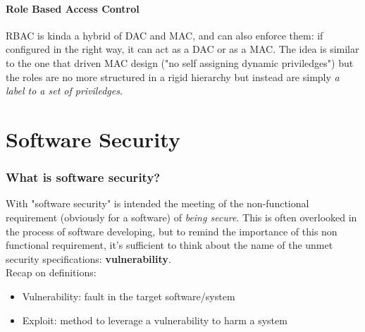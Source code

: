 \documentclass{article}
\begin{document}
			\subsection{Role Based Access Control}
				RBAC is kinda a hybrid of DAC and MAC, and can also enforce them: if configured in the right way, it can act as a DAC or as a MAC. The idea is similar to the one that driven MAC design ("no self assigning dynamic priviledges") but the roles are no more structured in a rigid hierarchy but instead are simply \emph{a label to a set of priviledges}.
					
	\clearpage \part{Software Security}		
		\section{What is software security?}
			With "software security" is intended the meeting of the non-functional requirement (obviously for a software) of \emph{being secure}. This is often overlooked in the process of software developing, but to remind the importance of this non functional requirement, it's sufficient to think about the name of the unmet security specifications: \textbf{vulnerability}.\\
			Recap on definitions:
			\begin{itemize}
				\item Vulnerability: fault in the target software/system
				\item Exploit: method to leverage a vulnerability to harm a system
			\end{itemize}
			
\end{document}
